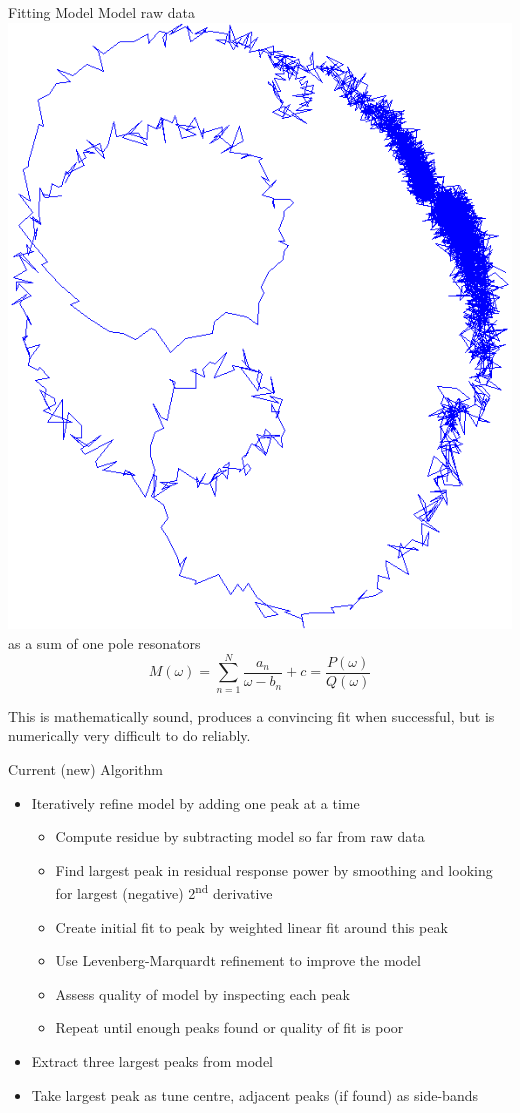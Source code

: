 \documentclass[xcolor=table]{beamer}
\begin{document}
%
\begin{frame}{Fitting Model}
Model raw data
\includegraphics[align=c, width=0.25\linewidth]{raw.png}
as a sum of one pole resonators
\[
    M(\omega) = \sum_{n=1}^N\frac{a_n}{\omega-b_n} + c
              = \frac{P(\omega)}{Q(\omega)}
\]

This is mathematically sound, produces a convincing fit when successful, but is
numerically very difficult to do reliably.

\end{frame}


%
\begin{frame}{Current (new) Algorithm}
\begin{itemize}
\item Iteratively refine model by adding one peak at a time
    \begin{itemize}
    \item Compute residue by subtracting model so far from raw data
    \item Find largest peak in residual response power by smoothing and looking
        for largest (negative) 2\textsuperscript{nd} derivative
    \item Create initial fit to peak by weighted linear fit around this peak
    \item Use Levenberg-Marquardt refinement to improve the model
    \item Assess quality of model by inspecting each peak
    \item Repeat until enough peaks found or quality of fit is poor
    \end{itemize}
\item Extract three largest peaks from model
\item Take largest peak as tune centre, adjacent peaks (if found) as side-bands
\end{itemize}
\end{frame}
\end{document}
